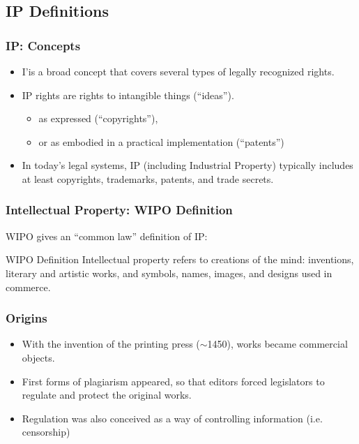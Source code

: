 \subsection{IP Definitions}
\begin{frame}
\frametitle{IP: Concepts}

\begin{itemize}
\item I'is a broad concept that covers several types of legally recognized rights.
\item IP rights are rights to \alert{intangible things} (``ideas'').
	\begin{itemize}
	\item as expressed (``copyrights''), 
	\item or as em­bodied in a practical implementation (``patents'')
	\end{itemize}
\item In today’s legal systems, IP (including Industrial Property) typically includes at least \alert{copy­rights}, \alert{trademarks}, \alert{patents}, and \alert{trade secrets}.

\end{itemize}

\end{frame}



\begin{frame}
\frametitle{Intellectual Property: WIPO Definition}

\textsc{WIPO} gives an ``common law'' definition of IP:

\begin{block}{WIPO Definition}
  Intellectual property refers to creations of the mind:
  inventions, literary and artistic works, and symbols, names, images,
  and designs used in commerce.
\end{block}

\end{frame}


\begin{frame}
\frametitle{Origins}

\begin{itemize}
\item With the invention of the printing press ($\sim$1450), works became commercial objects.
\item First forms of plagiarism appeared, so that editors forced legislators
to regulate and protect the original works.
\item Regulation was also conceived as a way of controlling information (i.e.
censorship)
\end{itemize}

\end{frame}

